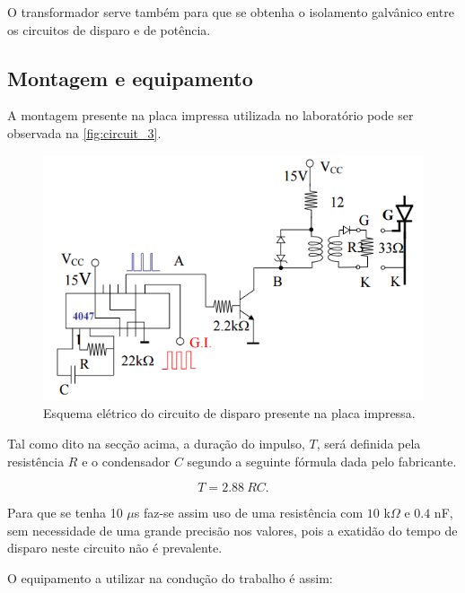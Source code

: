 \documentclass[a4paper,11pt]{article}
\numberwithin{equation}{section}
\begin{document}
O transformador serve também para que se obtenha o isolamento galvânico entre os circuitos de disparo e de potência.

\subsection{Montagem e equipamento}

A montagem presente na placa impressa utilizada no laboratório pode ser observada na \autoref{fig:circuit_3}.

\begin{figure}[h]
	\centering
	\includegraphics[keepaspectratio=true, scale=0.45]{teoricas/assembly_circuit}
	\caption{Esquema elétrico do circuito de disparo presente na placa impressa.}
	\label{fig:circuit_3}
	\vspace{-0.8em}
\end{figure}

Tal como dito na secção acima, a duração do impulso, $T$, será definida pela resistência $R$ e o condensador $C$ segundo a seguinte fórmula dada pelo fabricante.

\vspace{-3mm}
\begin{equation}
T = 2.88 \ RC.
\end{equation}

Para que se tenha 10 $\mu$s faz-se assim uso de uma resistência com $10$ k$\Omega$ e $0.4$ nF, sem necessidade de uma grande precisão nos valores, pois a exatidão do tempo de disparo neste circuito não é prevalente.

O equipamento a utilizar na condução do trabalho é assim:

\vspace{-2mm}
\end{document}
